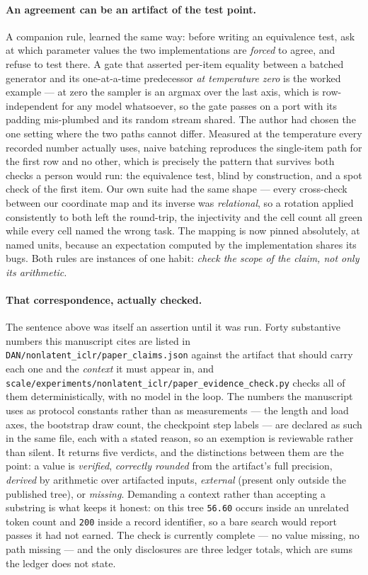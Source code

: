 \documentclass[11pt]{article}
\begin{document}
\paragraph{An agreement can be an artifact of the test point.} A companion rule, learned
the same way: before writing an equivalence test, ask at which parameter values the two
implementations are \emph{forced} to agree, and refuse to test there. A gate that
asserted per-item equality between a batched generator and its one-at-a-time
predecessor \emph{at temperature zero} is the worked example --- at zero the sampler is
an argmax over the last axis, which is row-independent for any model whatsoever, so the
gate passes on a port with its padding mis-plumbed and its random stream shared. The
author had chosen the one setting where the two paths cannot differ. Measured at the
temperature every recorded number actually uses, naive batching reproduces the
single-item path for the first row and no other, which is precisely the pattern that
survives both checks a person would run: the equivalence test, blind by construction,
and a spot check of the first item. Our own suite had the same shape --- every
cross-check between our coordinate map and its inverse was \emph{relational}, so a
rotation applied consistently to both left the round-trip, the injectivity and the cell
count all green while every cell named the wrong task. The mapping is now pinned
absolutely, at named units, because an expectation computed by the implementation shares
its bugs. Both rules are instances of one habit: \emph{check the scope of the claim, not
only its arithmetic.}

\paragraph{That correspondence, actually checked.} The sentence above was itself an
assertion until it was run. Forty substantive numbers this manuscript cites are listed
in \texttt{DAN/nonlatent\_iclr/paper\_claims.json} against the artifact that should carry
each one and the \emph{context} it must appear in, and
\texttt{scale/experiments/nonlatent\_iclr/paper\_evidence\_check.py} checks all of them
deterministically, with no model in the loop. The numbers the manuscript uses as
protocol constants rather than as measurements --- the length and load axes, the
bootstrap draw count, the checkpoint step labels --- are declared as such in the same
file, each with a stated reason, so an exemption is reviewable rather than silent. It returns five verdicts, and the
distinctions between them are the point: a value is \emph{verified}, \emph{correctly
rounded} from the artifact's full precision, \emph{derived} by arithmetic over artifacted
inputs, \emph{external} (present only outside the published tree), or \emph{missing}.
Demanding a context rather than accepting a substring is what keeps it honest: on this
tree \texttt{56.60} occurs inside an unrelated token count and \texttt{200} inside a
record identifier, so a bare search would report passes it had not earned. The check is
currently complete --- no value missing, no path missing --- and the only disclosures are
three ledger totals, which are sums the ledger does not state.
\end{document}

